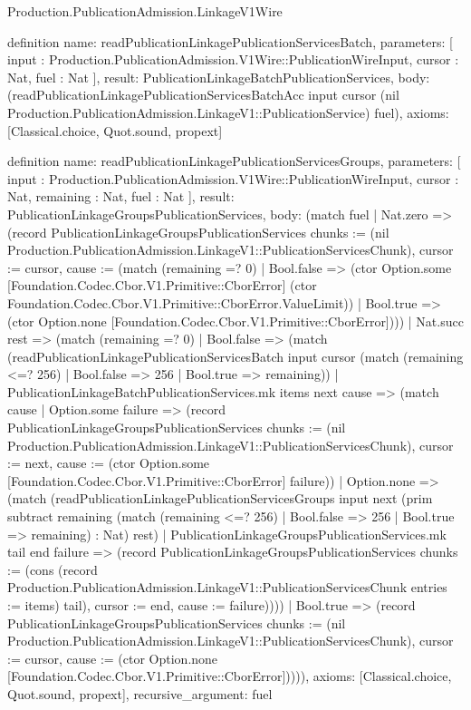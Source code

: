 \begin{lexlean}{Production.PublicationAdmission.LinkageV1Wire}
\begin{semanticmodule}
definition{
  name: readPublicationLinkagePublicationServicesBatch,
  parameters: [
    input : Production.PublicationAdmission.V1Wire::PublicationWireInput,
    cursor : Nat,
    fuel : Nat
  ],
  result: PublicationLinkageBatchPublicationServices,
  body: (readPublicationLinkagePublicationServicesBatchAcc input cursor (nil Production.PublicationAdmission.LinkageV1::PublicationService) fuel),
  axioms: [Classical.choice, Quot.sound, propext]
}

definition{
  name: readPublicationLinkagePublicationServicesGroups,
  parameters: [
    input : Production.PublicationAdmission.V1Wire::PublicationWireInput,
    cursor : Nat,
    remaining : Nat,
    fuel : Nat
  ],
  result: PublicationLinkageGroupsPublicationServices,
  body: (match fuel
    | Nat.zero => (record PublicationLinkageGroupsPublicationServices {chunks := (nil Production.PublicationAdmission.LinkageV1::PublicationServicesChunk), cursor := cursor, cause := (match (remaining =? 0)
      | Bool.false => (ctor Option.some [Foundation.Codec.Cbor.V1.Primitive::CborError] (ctor Foundation.Codec.Cbor.V1.Primitive::CborError.ValueLimit))
      | Bool.true => (ctor Option.none [Foundation.Codec.Cbor.V1.Primitive::CborError]))})
    | Nat.succ rest => (match (remaining =? 0)
      | Bool.false => (match (readPublicationLinkagePublicationServicesBatch input cursor (match (remaining <=? 256)
          | Bool.false => 256
          | Bool.true => remaining))
        | PublicationLinkageBatchPublicationServices.mk items next cause => (match cause
          | Option.some failure => (record PublicationLinkageGroupsPublicationServices {chunks := (nil Production.PublicationAdmission.LinkageV1::PublicationServicesChunk), cursor := next, cause := (ctor Option.some [Foundation.Codec.Cbor.V1.Primitive::CborError] failure)})
          | Option.none => (match (readPublicationLinkagePublicationServicesGroups input next (prim subtract remaining (match (remaining <=? 256)
              | Bool.false => 256
              | Bool.true => remaining) : Nat) rest)
            | PublicationLinkageGroupsPublicationServices.mk tail end failure => (record PublicationLinkageGroupsPublicationServices {chunks := (cons (record Production.PublicationAdmission.LinkageV1::PublicationServicesChunk {entries := items}) tail), cursor := end, cause := failure}))))
      | Bool.true => (record PublicationLinkageGroupsPublicationServices {chunks := (nil Production.PublicationAdmission.LinkageV1::PublicationServicesChunk), cursor := cursor, cause := (ctor Option.none [Foundation.Codec.Cbor.V1.Primitive::CborError])}))),
  axioms: [Classical.choice, Quot.sound, propext],
  recursive_argument: fuel
}


\end{semanticmodule}
\end{lexlean}
